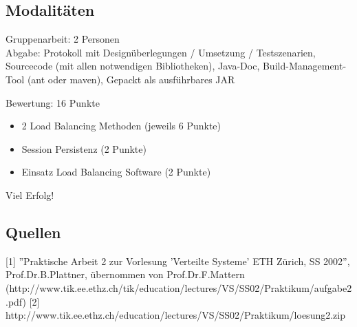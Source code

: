 \clearpage

\subsection{Modalitäten}

Gruppenarbeit: 2 Personen\\
Abgabe: Protokoll mit Designüberlegungen / Umsetzung / Testszenarien, Sourcecode (mit allen notwendigen Bibliotheken), Java-Doc, Build-Management-Tool (ant oder maven), Gepackt als ausführbares JAR

Bewertung: 16 Punkte
\begin{itemize}
	\item 2 Load Balancing Methoden (jeweils 6 Punkte)
	\item Session Persistenz (2 Punkte)
	\item Einsatz Load Balancing Software (2 Punkte)
\end{itemize}

Viel Erfolg!

\subsection{Quellen}

[1] ''Praktische Arbeit 2 zur Vorlesung 'Verteilte Systeme' ETH Zürich, SS 2002'', Prof.Dr.B.Plattner, übernommen von Prof.Dr.F.Mattern (http://www.tik.ee.ethz.ch/tik/education/lectures/VS/SS02/Praktikum/aufgabe2.pdf)
[2] http://www.tik.ee.ethz.ch/education/lectures/VS/SS02/Praktikum/loesung2.zip


\clearpage
